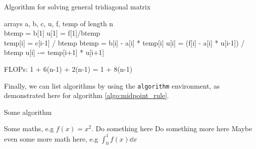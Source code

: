 \documentclass[english,notitlepage]{revtex4-1}  %
\begin{document}
\begin{algorithm}[H]
	\caption{Algorithm for solving general tridiagonal matrix}
	\begin{algorithmic}
		\State arrays a, b, c, u, f, temp of length n
		\\
		\State btemp = b[1]
		\State u[1] = f[1]/btemp
		\\
			\State temp[i] = c[i-1] / btemp
			\State btemp = b[i] - a[i] * temp[i]
			\State u[i] = (f[i] - a[i] * u[i-1]) / btemp
		\EndFor
			\State u[i] -= temp[i+1] * u[i+1]
		\EndFor
	\end{algorithmic}
\end{algorithm}

FLOPs: 1 + 6(n-1) + 2(n-1) = 1 + 8(n-1)

Finally, we can list algorithms by using the \texttt{algorithm} environment, as demonstrated here for algorithm \ref{algo:midpoint_rule}.
\begin{algorithm}[H]
    \caption{Some algorithm}\label{algo:midpoint_rule}
    \begin{algorithmic}
        \State Some maths, e.g $f(x) = x^2$.  
        \State Do something here 
        \EndFor
        \State Do something more here 
        \EndWhile
        \State Maybe even some more math here, e.g $\int_0^1 f(x) \dd x$
    \end{algorithmic}
\end{algorithm}
   
\end{document}
